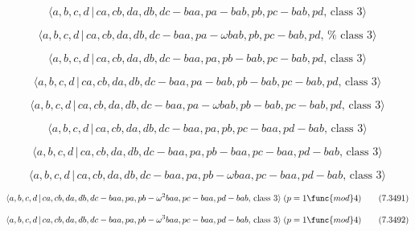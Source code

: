 \documentclass[10pt]{article}
\begin{document}
\begin{equation}
\langle a,b,c,d\,|\,ca,cb,da,db,dc-baa,pa-bab,pb,pc-bab,pd,\,\text{class }%
3\rangle  \tag{7.3483}
\end{equation}

\begin{equation}
\langle a,b,c,d\,|\,ca,cb,da,db,dc-baa,pa-\omega bab,pb,pc-bab,pd,\,\text{%
class }3\rangle  \tag{7.3484}
\end{equation}

\begin{equation}
\langle a,b,c,d\,|\,ca,cb,da,db,dc-baa,pa,pb-bab,pc-bab,pd,\,\text{class }%
3\rangle  \tag{7.3485}
\end{equation}

\begin{equation}
\langle a,b,c,d\,|\,ca,cb,da,db,dc-baa,pa-bab,pb-bab,pc-bab,pd,\,\text{class 
}3\rangle  \tag{7.3486}
\end{equation}

\begin{equation}
\langle a,b,c,d\,|\,ca,cb,da,db,dc-baa,pa-\omega bab,pb-bab,pc-bab,pd,\,%
\text{class }3\rangle  \tag{7.3487}
\end{equation}

\begin{equation}
\langle a,b,c,d\,|\,ca,cb,da,db,dc-baa,pa,pb,pc-baa,pd-bab,\,\text{class }%
3\rangle  \tag{7.3488}
\end{equation}

\begin{equation}
\langle a,b,c,d\,|\,ca,cb,da,db,dc-baa,pa,pb-baa,pc-baa,pd-bab,\,\text{class 
}3\rangle  \tag{7.3489}
\end{equation}

\begin{equation}
\langle a,b,c,d\,|\,ca,cb,da,db,dc-baa,pa,pb-\omega baa,pc-baa,pd-bab,\,%
\text{class }3\rangle  \tag{7.3490}
\end{equation}

\begin{equation}
\langle a,b,c,d\,|\,ca,cb,da,db,dc-baa,pa,pb-\omega ^{2}baa,pc-baa,pd-bab,\,%
\text{class }3\rangle \;(p=1\func{mod}4)  \tag{7.3491}
\end{equation}

\begin{equation}
\langle a,b,c,d\,|\,ca,cb,da,db,dc-baa,pa,pb-\omega ^{3}baa,pc-baa,pd-bab,\,%
\text{class }3\rangle \;(p=1\func{mod}4)  \tag{7.3492}
\end{equation}
\end{document}
